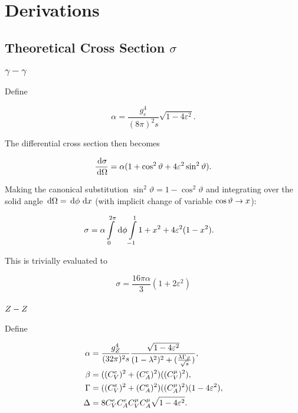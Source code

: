 \documentclass[]{report}
\begin{document}
\tableofcontents

\chapter{Derivations}

\section{Theoretical Cross Section $\sigma$}

\subsection{$\gamma-\gamma$}

Define

$$
\alpha = \frac{g_{e}^{4}}{(8\pi)^{2}s} \sqrt{1-4\varepsilon^{2}}.
$$

The differential cross section then becomes

$$
\frac{\,\operatorname{d}\!{\sigma}}{\,\operatorname{d}\!{\Omega}} = \alpha (1 + \cos^{2}{\vartheta} + 4\varepsilon^{2}\sin^{2}{\vartheta}).
$$

Making the canonical substitution $\sin^{2}{\vartheta} = 1 - \cos^{2}{\vartheta}$ and integrating over the solid angle $\,\operatorname{d}\!{\Omega} = \,\operatorname{d}\!{\phi}\,\operatorname{d}\!{x}$ (with implicit change of variable $\cos{\vartheta}\rightarrow x$):

\begin{align*}
\sigma &= \alpha \int\limits_{0}^{2\pi}\d{\phi} \int\limits_{-1}^{1} 1 + x^{2} + 4\varepsilon^{2}(1 - x^{2}).
\end{align*}

This is trivially evaluated to

$$
\sigma = \frac{16\pi\alpha}{3}(1 + 2\varepsilon^{2})
$$

\subsection{$Z -Z $}

Define

\begin{align*}
\alpha &= \frac{g_{\Zzero}^{4}}{(32\pi)^{2}s} \frac{\sqrt{1-4\varepsilon^{2}}}{(1-\lambda^{2})^{2} + (\frac{\lambda\Gamma_{\Zzero}}{\rts})},
\\
\beta &= ((C_{V}^{e})^{2} + (C_{A}^{e})^{2})((C_{V}^{\mu})^{2}),
\\
\Gamma &= ((C_{V}^{e})^{2} + (C_{A}^{e})^{2})((C_{A}^{\mu})^{2})(1-4\varepsilon^{2}),
\\
\Delta &= 8C_{V}^{e}C_{A}^{e}C_{V}^{\mu}C_{A}^{\mu}\sqrt{1-4\varepsilon^{2}}.
\end	{align*}
\end{document}
